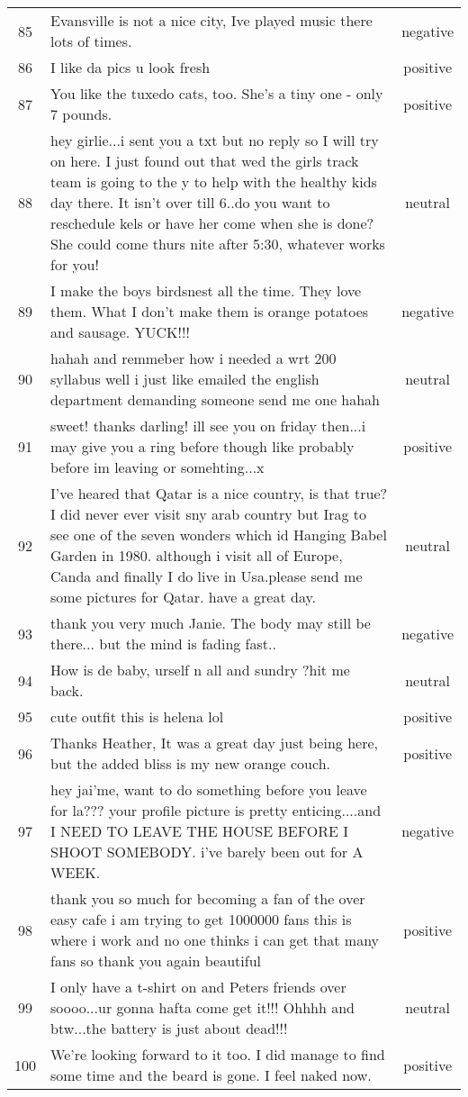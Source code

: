 \begin{center}
\begin{footnotesize}
\begin{longtable}{cp{3.8in}c}
85 & Evansville is not a nice city, Ive played music there lots of times. & negative\\
86 & I like da pics u look fresh & positive\\
87 & You like the tuxedo cats, too. She's a tiny one - only 7 pounds. & positive\\
88 & hey girlie...i sent you a txt but no reply so I will try on here.  I just found out that wed the girls track team is going to the y to help with the healthy kids day there.  It isn't over till 6..do you want to reschedule kels or have her come when she is done?  She could come thurs nite after 5:30, whatever works for you! & neutral\\
89 & I make the boys birdsnest all the time. They love them. What I don't make them is orange potatoes and sausage. YUCK!!! & negative\\
90 & hahah and remmeber how i needed a wrt 200 syllabus well i just like emailed the english department demanding someone send me one hahah & neutral\\
91 & sweet! thanks darling! ill see you on friday then...i may give you a ring before though like probably before im leaving or somehting...x & positive\\
92 & I've heared that Qatar is a nice country, is that true? I did never ever visit sny arab country but Irag to see one of the seven wonders which id Hanging Babel Garden in 1980. although i visit all of Europe, Canda and finally I do live in Usa.please send me some pictures for Qatar. have a great day. & neutral\\
93 & thank you very much Janie.  The body may still be there... but the mind is fading fast.. & negative\\
94 & How is de baby, urself n all and sundry ?hit me back.  & neutral\\
95 & cute outfit this is helena lol & positive\\
96 & Thanks Heather, It was a great day just being here, but the added bliss is my new orange couch. & positive\\
97 & hey jai'me, want to do something before you leave for la??? your profile picture is pretty enticing....and I NEED TO LEAVE THE HOUSE BEFORE I SHOOT SOMEBODY. i've barely been out for A WEEK. & negative\\
98 & thank you so much for becoming a fan of the over easy cafe i am trying to get 1000000 fans     this is where i work and no one thinks i can get that many fans so thank you again beautiful & positive\\
99 & I only have a t-shirt on and Peters friends over soooo...ur gonna hafta come get it!!! Ohhhh and btw...the battery is just about dead!!! & neutral\\
100 & We're looking forward to it too.  I did manage to find some time and the beard is gone.  I feel naked now. & positive\\
		\end{longtable}
		\end{footnotesize}
	\end{center}
